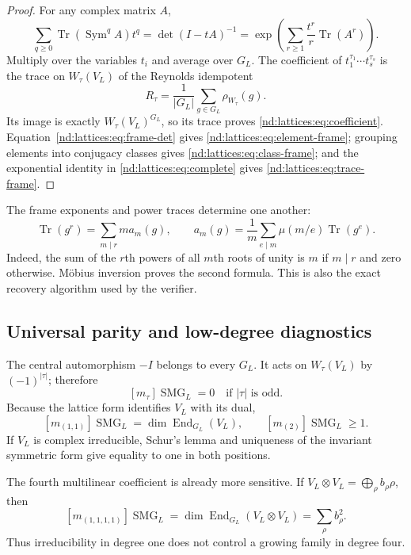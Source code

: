 \documentclass[10pt]{article}
\newcommand{\Sym}{\operatorname{Sym}}
\newcommand{\Tr}{\operatorname{Tr}}
\newcommand{\SMG}{\operatorname{SMG}}
\newcommand{\MGF}{\SMG}
\newcommand{\End}{\operatorname{End}}
\begin{document}
\begin{proof}
For any complex matrix $A$,
\begin{equation}\label{nd:lattices:eq:complete}
 \sum_{q\ge0}\Tr(\Sym^qA)t^q
 =\det(I-tA)^{-1}
 =\exp\!\left(\sum_{r\ge1}\frac{t^r}{r}\Tr(A^r)\right).
\end{equation}
Multiply over the variables $t_i$ and average over $G_L$.  The coefficient of
$t_1^{\tau_1}\cdots t_s^{\tau_s}$ is the trace on $W_\tau(V_L)$ of the
Reynolds idempotent
\[
 R_\tau=\frac1{|G_L|}\sum_{g\in G_L}\rho_{W_\tau}(g).
\]
Its image is exactly $W_\tau(V_L)^{G_L}$, so its trace proves
\eqref{nd:lattices:eq:coefficient}.  Equation~\eqref{nd:lattices:eq:frame-det} gives
\eqref{nd:lattices:eq:element-frame}; grouping elements into conjugacy classes gives
\eqref{nd:lattices:eq:class-frame}; and the exponential identity in
\eqref{nd:lattices:eq:complete} gives \eqref{nd:lattices:eq:trace-frame}.
\end{proof}

The frame exponents and power traces determine one another:
\begin{equation}\label{nd:lattices:eq:trace-frame-inversion}
 \Tr(g^r)=\sum_{m\mid r}m a_m(g),\qquad
 a_m(g)=\frac1m\sum_{e\mid m}\mu(m/e)\Tr(g^e).
\end{equation}
Indeed, the sum of the $r$th powers of all $m$th roots of unity is $m$ if
$m\mid r$ and zero otherwise.  Möbius inversion proves the second formula.
This is also the exact recovery algorithm used by the verifier.

\subsection{Universal parity and low-degree diagnostics}

The central automorphism $-I$ belongs to every $G_L$.  It acts on
$W_\tau(V_L)$ by $(-1)^{|\tau|}$; therefore
\begin{equation}\label{nd:lattices:eq:parity}
 \boxed{[m_\tau]\MGF_L=0\quad\text{if }|\tau|\text{ is odd}.}
\end{equation}
Because the lattice form identifies $V_L$ with its dual,
\begin{equation}\label{nd:lattices:eq:low-degree}
 [m_{(1,1)}]\MGF_L=\dim\End_{G_L}(V_L),
 \qquad [m_{(2)}]\MGF_L\ge1.
\end{equation}
If $V_L$ is complex irreducible, Schur's lemma and uniqueness of the invariant
symmetric form give equality to one in both positions.

The fourth multilinear coefficient is already more sensitive.  If
$V_L\otimes V_L=\bigoplus_\rho b_\rho\rho$, then
\begin{equation}\label{nd:lattices:eq:fourth}
 [m_{(1,1,1,1)}]\MGF_L
 =\dim\End_{G_L}(V_L\otimes V_L)=\sum_\rho b_\rho^2.
\end{equation}
Thus irreducibility in degree one does not control a growing family in degree
four.
\end{document}
